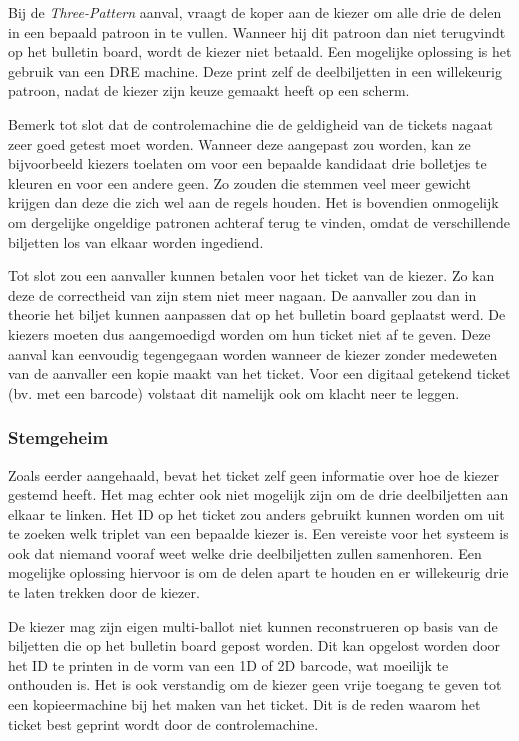 \npar Bij de \textit{Three-Pattern} aanval, vraagt de koper aan de kiezer om alle drie de delen in een bepaald patroon in te vullen. Wanneer hij dit patroon dan niet terugvindt op het bulletin board, wordt de kiezer niet betaald. Een mogelijke oplossing is het gebruik van een DRE machine. Deze print zelf de deelbiljetten in een willekeurig patroon, nadat de kiezer zijn keuze gemaakt heeft op een scherm.

\npar Bemerk tot slot dat de controlemachine die de geldigheid van de tickets nagaat zeer goed getest moet worden. Wanneer deze aangepast zou worden, kan ze bijvoorbeeld kiezers toelaten om voor een bepaalde kandidaat drie bolletjes te kleuren en voor een andere geen. Zo zouden die stemmen veel meer gewicht krijgen dan deze die zich wel aan de regels houden. Het is bovendien onmogelijk om dergelijke ongeldige patronen achteraf terug te vinden, omdat de verschillende biljetten los van elkaar worden ingediend.

\npar Tot slot zou een aanvaller kunnen betalen voor het ticket van de kiezer. Zo kan deze de correctheid van zijn stem niet meer nagaan. De aanvaller zou dan in theorie het biljet kunnen aanpassen dat op het bulletin board geplaatst werd. De kiezers moeten dus aangemoedigd worden om hun ticket niet af te geven. Deze aanval kan eenvoudig tegengegaan worden wanneer de kiezer zonder medeweten van de aanvaller een kopie maakt van het ticket. Voor een digitaal getekend ticket (bv. met een barcode) volstaat dit namelijk ook om klacht neer te leggen.

\subsubsection{Stemgeheim}

Zoals eerder aangehaald, bevat het ticket zelf geen informatie over hoe de kiezer gestemd heeft. Het mag echter ook niet mogelijk zijn om de drie deelbiljetten aan elkaar te linken. Het ID op het ticket zou anders gebruikt kunnen worden om uit te zoeken welk triplet van een bepaalde kiezer is. Een vereiste voor het systeem is ook dat niemand vooraf weet welke drie deelbiljetten zullen samenhoren. Een mogelijke oplossing hiervoor is om de delen apart te houden en er willekeurig drie te laten trekken door de kiezer.

\npar De kiezer mag zijn eigen multi-ballot niet kunnen reconstrueren op basis van de biljetten die op het bulletin board gepost worden. Dit kan opgelost worden door het ID te printen in de vorm van een 1D of 2D barcode, wat moeilijk te onthouden is. Het is ook verstandig om de kiezer geen vrije toegang te geven tot een kopieermachine bij het maken van het ticket. Dit is de reden waarom het ticket best geprint wordt door de controlemachine.

